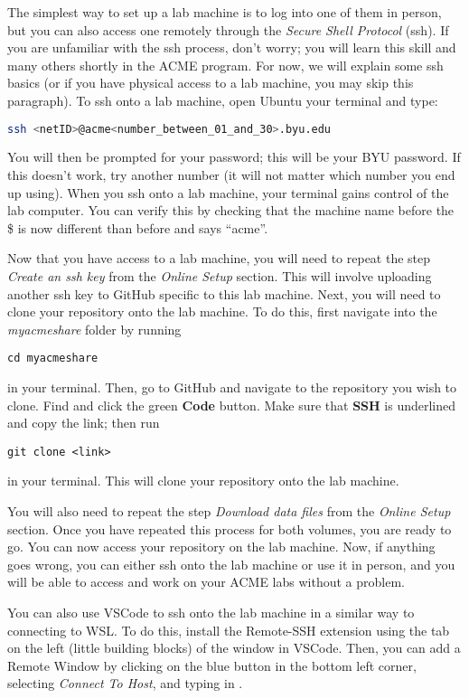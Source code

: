 The simplest way to set up a lab machine is to log into one of them in person, but you can also access one remotely through the \emph{Secure Shell Protocol} (ssh).
If you are unfamiliar with the ssh process, don't worry; you will learn this skill and many others shortly in the ACME program.
For now, we will explain some ssh basics (or if you have physical access to a lab machine, you may skip this paragraph).
To ssh onto a lab machine, open 
\ifwindows
Ubuntu
\else
your terminal
\fi
and type:
\begin{lstlisting}[language=bash]
ssh <netID>@acme<number_between_01_and_30>.byu.edu
\end{lstlisting}
You will then be prompted for your password; this will be your BYU password.
If this doesn't work, try another number (it will not matter which number you end up using).
When you ssh onto a lab machine, your terminal gains control of the lab computer.
You can verify this by checking that the machine name before the \$ is now different than before and says ``acme''.

Now that you have access to a lab machine, you will need to repeat the step \emph{Create an ssh key} from the \emph{Online Setup} section.
This will involve uploading another ssh key to GitHub specific to this lab machine.
Next, you will need to clone your repository onto the lab machine.
To do this, first navigate into the \emph{myacmeshare} folder by running 
\begin{lstlisting}
cd myacmeshare
\end{lstlisting}
in your terminal.
Then, go to GitHub and navigate to the repository you wish to clone.
Find and click the green \textbf{Code} button.
Make sure that \textbf{SSH} is underlined and copy the link; then run 
\begin{lstlisting}
git clone <link>
\end{lstlisting} 
in your terminal.
This will clone your repository onto the lab machine.

You will also need to repeat the step \emph{Download data files} from the \emph{Online Setup} section.
Once you have repeated this process for both volumes, you are ready to go.
You can now access your repository on the lab machine.
Now, if anything goes wrong, you can either ssh onto the lab machine or use it in person, and you will be able to access and work on your ACME labs without a problem.

You can also use VSCode to ssh onto the lab machine in a similar way to connecting to WSL.
To do this, install the Remote-SSH extension using the  tab on the left (little building blocks) of the window in VSCode.
Then, you can add a Remote Window by clicking on the blue  button in the bottom left corner, selecting \emph{Connect To Host}, and typing in .
\fi

